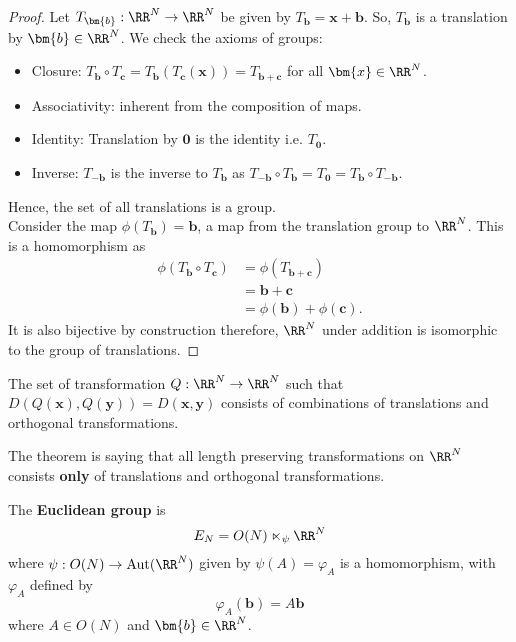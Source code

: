 \documentclass[12pt, a4paper]{article}
\DeclareMathOperator{\aut}{Aut}
\begin{document}
\begin{proof}
    Let \(T_{\bm{b}} : \RR^N \to \RR^N\) be given by \(T_{\bm{b}} =\bm{x}+\bm{b}\). So, \(T_{\bm{b}}\) is a translation by \(\bm{b} \in \RR^N\). We check the axioms of groups:
    \begin{itemize}
        \item Closure: \(T_{\bm{b}} \circ T_{\bm{c}} =T_{\bm{b}}(T_{\bm{c}}(\bm{x})) = T_{\bm{b}+\bm{c}}\) for all \(\bm{x} \in \RR^N\).
        \item Associativity: inherent from the composition of maps.
        \item Identity: Translation by \(\bm{0}\) is the identity i.e. \(T_{\bm{0}}\).
        \item Inverse: \(T_{-\bm{b}}\) is the inverse to \(T_{\bm{b}}\) as \(T_{-\bm{b}} \circ T_{\bm{b}} =T_{\bm{0}}= T_{\bm{b}}\circ T_{-\bm{b}}\).
    \end{itemize}
    Hence, the set of all translations is a group. \\
    Consider the map \(\phi(T_{\bm{b}})=\bm{b}\), a map from the translation group to \(\RR^N\). This is a homomorphism as
    \[\begin{aligned}
        \phi(T_{\bm{b}} \circ T_{\bm{c}}) &= \phi(T_{\bm{b+c}}) \\
        &= \bm{b}+\bm{c} \\
        &= \phi(\bm{b}) + \phi(\bm{c}).
    \end{aligned}\]
    It is also bijective by construction therefore, \(\RR^N\) under addition is isomorphic to the group of translations.
\end{proof}

\begin{mdthm}
    The set of transformation \(Q : \RR^N \to \RR^N\) such that \(D(Q(\bm{x}),Q(\bm{y})) =D(\bm{x},\bm{y})\) consists of combinations of translations and orthogonal transformations.
\end{mdthm}

\begin{mdnote}
    The theorem is saying that all length preserving transformations on \(\RR^N\) consists \textbf{only} of translations and orthogonal transformations.
\end{mdnote}

\begin{definition}
    The \textbf{Euclidean group} is
    \[E_N=O(N) \ltimes_{\psi} \RR^N\]
    where \(\psi : O(N) \to \aut(\RR^N)\) given by \(\psi(A)=\varphi_A\) is a homomorphism, with \(\varphi_A\) defined by 
    \[\varphi_A(\bm{b})=A\bm{b}\]
    where \(A \in O(N)\) and \(\bm{b} \in \RR^N\).
\end{definition}
\end{document}
